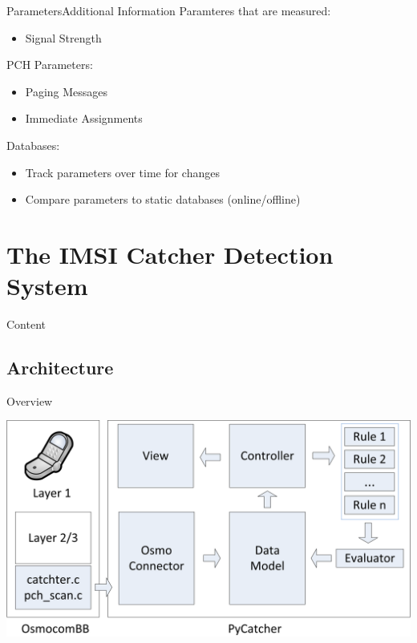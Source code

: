 \documentclass{beamer}
\newcommand{\tocsection}[1]{
  \section{#1}
  \begin{frame}{Content}
    \tableofcontents[sectionstyle=show/shaded, subsectionstyle=hide/hide/hide]%
  \end{frame}
 }
\begin{document}
\begin{frame}{Parameters}{Additional Information}
Paramteres that are measured:
\begin{itemize}
    \item Signal Strength
\end{itemize}
PCH Parameters:
\begin{itemize}
    \item Paging Messages
    \item Immediate Assignments
\end{itemize}
Databases:
\begin{itemize}
    \item Track parameters over time for changes
    \item Compare parameters to static databases (online/offline)
\end{itemize}
\end{frame}

\tocsection{The IMSI Catcher Detection System}
\subsection{Architecture}
\begin{frame}{Overview}
\begin{center}
	\includegraphics[width=\textwidth]{Architecture_software}
\end{center}
\end{frame}
\end{document}
